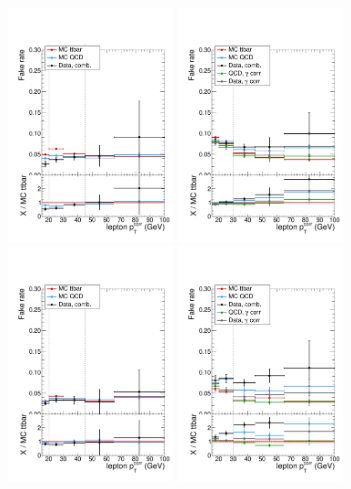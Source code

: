 \begin{figure}[htp]
\centering
\includegraphics[width=0.39\textwidth]{ch7_figs/fr_mu_barrel.pdf}
\includegraphics[width=0.39\textwidth]{ch7_figs/fr_el_barrel.pdf}\\
\includegraphics[width=0.39\textwidth]{ch7_figs/fr_mu_endcap.pdf}
\includegraphics[width=0.39\textwidth]{ch7_figs/fr_el_endcap.pdf}

\end{figure}
